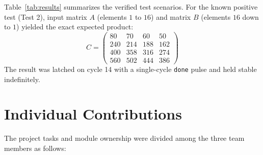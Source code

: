 \documentclass[conference]{IEEEtran}
\begin{document}
Table~\ref{tab:results} summarizes the verified test scenarios. For the known positive test (Test 2), input matrix $A$ (elements $1$ to $16$) and matrix $B$ (elements $16$ down to $1$) yielded the exact expected product:
\begin{equation}
C = \begin{pmatrix} 80 & 70 & 60 & 50 \\ 240 & 214 & 188 & 162 \\ 400 & 358 & 316 & 274 \\ 560 & 502 & 444 & 386 \end{pmatrix}
\end{equation}
The result was latched on cycle 14 with a single-cycle \texttt{done} pulse and held stable indefinitely.

\section{Individual Contributions}
The project tasks and module ownership were divided among the three team members as follows:
\end{document}
